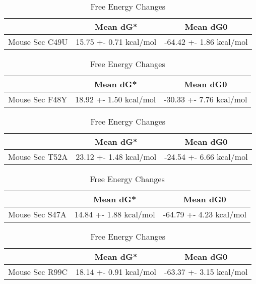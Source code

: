 \begin{table}[ht]
  \centering
  \begin{tabular}{|c|c|c|}
  \hline
    & Mean dG* & Mean dG0 \\
  \hline
  Mouse Sec C49U & 15.75 +- 0.71 kcal/mol & -64.42 +- 1.86 kcal/mol \\
  \hline
  \end{tabular}
  \caption{Free Energy Changes}
\end{table}

\begin{table}[ht]
  \centering
  \begin{tabular}{|c|c|c|}
  \hline
    & Mean dG* & Mean dG0 \\
  \hline
  Mouse Sec F48Y & 18.92 +- 1.50 kcal/mol & -30.33 +- 7.76 kcal/mol \\
  \hline
  \end{tabular}
  \caption{Free Energy Changes}
\end{table}

\begin{table}[ht]
  \centering
  \begin{tabular}{|c|c|c|}
  \hline
    & Mean dG* & Mean dG0 \\
  \hline
  Mouse Sec T52A & 23.12 +- 1.48 kcal/mol & -24.54 +- 6.66 kcal/mol \\
  \hline
  \end{tabular}
  \caption{Free Energy Changes}
\end{table}

\begin{table}[ht]
  \centering
  \begin{tabular}{|c|c|c|}
  \hline
    & Mean dG* & Mean dG0 \\
  \hline
  Mouse Sec S47A & 14.84 +- 1.88 kcal/mol & -64.79 +- 4.23 kcal/mol \\
  \hline
  \end{tabular}
  \caption{Free Energy Changes}
\end{table}

\begin{table}[ht]
  \centering
  \begin{tabular}{|c|c|c|}
  \hline
    & Mean dG* & Mean dG0 \\
  \hline
  Mouse Sec R99C & 18.14 +- 0.91 kcal/mol & -63.37 +- 3.15 kcal/mol \\
  \hline
  \end{tabular}
  \caption{Free Energy Changes}
\end{table}

